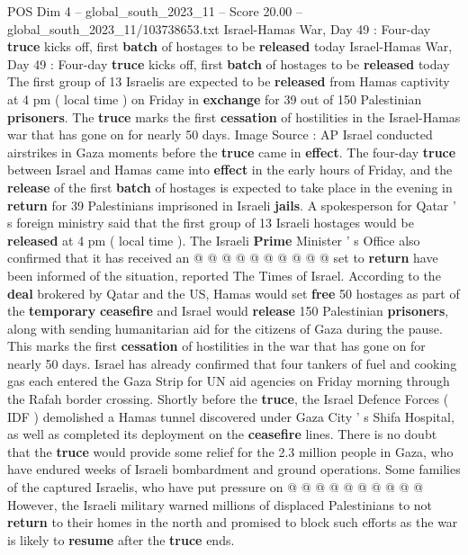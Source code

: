 \begin{textsample}{POS Dim 4 – global\_south\_2023\_11 – Score 20.00 – global\_south\_2023\_11/103738653.txt}  \label{ex:f4_pos_165}
Israel-Hamas War, Day 49 : Four-day \textbf{truce} kicks off, first \textbf{batch} of hostages to be \textbf{released} today Israel-Hamas War, Day 49 : Four-day \textbf{truce} kicks off, first \textbf{batch} of hostages to be \textbf{released} today The first group of 13 Israelis are expected to be \textbf{released} from Hamas captivity at 4 pm ( local time ) on Friday in \textbf{exchange} for 39 out of 150 Palestinian \textbf{prisoners}.
The \textbf{truce} marks the first \textbf{cessation} of hostilities in the Israel-Hamas war that has gone on for nearly 50 days.
Image Source : AP Israel conducted airstrikes in Gaza moments before the \textbf{truce} came in \textbf{effect}.
The four-day \textbf{truce} between Israel and Hamas came into \textbf{effect} in the early hours of Friday, and the \textbf{release} of the first \textbf{batch} of hostages is expected to take place in the evening in \textbf{return} for 39 Palestinians imprisoned in Israeli \textbf{jails}.
A spokesperson for Qatar ' s foreign ministry said that the first group of 13 Israeli hostages would be \textbf{released} at 4 pm ( local time ).
The Israeli \textbf{Prime} Minister ' s Office also confirmed that it has received an @ @ @ @ @ @ @ @ @ @ set to \textbf{return} have been informed of the situation, reported The Times of Israel.
According to the \textbf{deal} brokered by Qatar and the US, Hamas would set \textbf{free} 50 hostages as part of the \textbf{temporary} \textbf{ceasefire} and Israel would \textbf{release} 150 Palestinian \textbf{prisoners}, along with sending humanitarian aid for the citizens of Gaza during the pause.
This marks the first \textbf{cessation} of hostilities in the war that has gone on for nearly 50 days.
Israel has already confirmed that four tankers of fuel and cooking gas each entered the Gaza Strip for UN aid agencies on Friday morning through the Rafah border crossing.
Shortly before the \textbf{truce}, the Israel Defence Forces ( IDF ) demolished a Hamas tunnel discovered under Gaza City ' s Shifa Hospital, as well as completed its deployment on the \textbf{ceasefire} lines.
There is no doubt that the \textbf{truce} would provide some relief for the 2.3 million people in Gaza, who have endured weeks of Israeli bombardment and ground operations.
Some families of the captured Israelis, who have put pressure on @ @ @ @ @ @ @ @ @ @ However, the Israeli military warned millions of displaced Palestinians to not \textbf{return} to their homes in the north and promised to block such efforts as the war is likely to \textbf{resume} after the \textbf{truce} ends.

\end{textsample}
